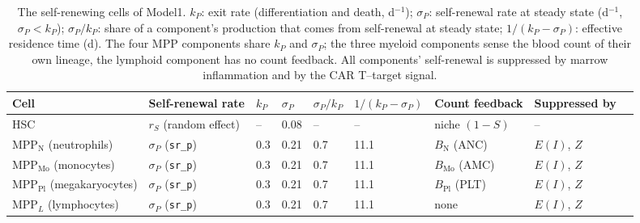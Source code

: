 \begin{table}[!htbp]
\centering
\footnotesize
\setlength{\tabcolsep}{3.5pt}
\caption{The self-renewing cells of Model1. $k_P$: exit rate (differentiation and death, d$^{-1}$); $\sigma_P$: self-renewal rate at steady state (d$^{-1}$, $\sigma_P<k_P$); $\sigma_P/k_P$: share of a component's production that comes from self-renewal at steady state; $1/(k_P-\sigma_P)$: effective residence time (d). The four MPP components share $k_P$ and $\sigma_P$; the three myeloid components sense the blood count of their own lineage, the lymphoid component has no count feedback. All components' self-renewal is suppressed by marrow inflammation and by the CAR T--target signal.}
\label{tab:selfrenewal}
\begin{tabular}{lllllll>{\raggedright\arraybackslash}p{2.2cm}l}
\toprule
Cell & Self-renewal rate & $k_P$ & $\sigma_P$ & $\sigma_P/k_P$ & $1/(k_P-\sigma_P)$ & Count feedback & Suppressed by \\
\midrule
HSC & $r_S$ (random effect) & -- & 0.08 & -- & -- & niche $(1-S)$ & -- \\
MPP$_{\mathrm{N}}$ (neutrophils) & $\sigma_P$ (\texttt{sr\_p}) & 0.3 & 0.21 & 0.7 & 11.1 & $B_{\mathrm{N}}$ (ANC) & $E(I)$, $Z$ \\
MPP$_{\mathrm{Mo}}$ (monocytes) & $\sigma_P$ (\texttt{sr\_p}) & 0.3 & 0.21 & 0.7 & 11.1 & $B_{\mathrm{Mo}}$ (AMC) & $E(I)$, $Z$ \\
MPP$_{\mathrm{Pl}}$ (megakaryocytes) & $\sigma_P$ (\texttt{sr\_p}) & 0.3 & 0.21 & 0.7 & 11.1 & $B_{\mathrm{Pl}}$ (PLT) & $E(I)$, $Z$ \\
MPP$_{L}$ (lymphocytes) & $\sigma_P$ (\texttt{sr\_p}) & 0.3 & 0.21 & 0.7 & 11.1 & none & $E(I)$, $Z$ \\
\bottomrule
\end{tabular}
\end{table}
